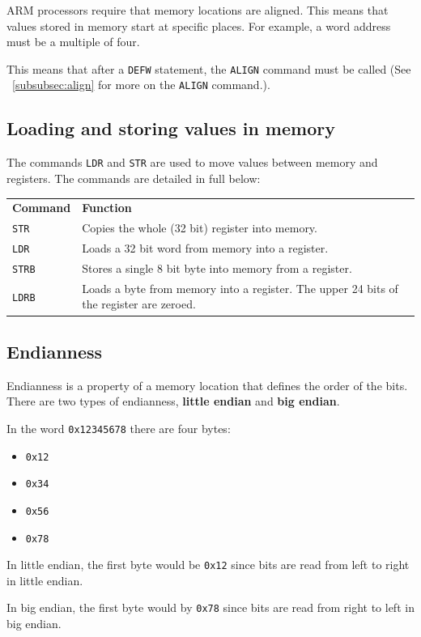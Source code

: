 ARM processors require that memory locations are aligned. This means that values stored in memory start at specific places. For example, a word address must be a multiple of four.

This means that after a {\tt DEFW} statement, the {\tt ALIGN} command must be called (See ~\ref{subsubsec:align} for more on the {\tt ALIGN} command.).

\subsection{Loading and storing values in memory}

The commands {\tt LDR} and {\tt STR} are used to move values between memory and registers. The commands are detailed in full below:

\begin{tabularx}{\textwidth}{l X}
	{\bf Command} & {\bf Function}\\
	{\tt STR} & Copies the whole (32 bit) register into memory.\\
	{\tt LDR} & Loads a 32 bit word from memory into a register.\\
	{\tt STRB} & Stores a single 8 bit byte into memory from a register.\\
	{\tt LDRB} & Loads a byte from memory into a register. The upper 24 bits of the register are zeroed.\\
\end{tabularx}

\subsection{Endianness}

Endianness is a property of a memory location that defines the order of the
bits. There are two types of endianness, {\bf little endian} and {\bf big
endian}.

In the word {\tt 0x12345678} there are four bytes:
\begin{itemize}
	\item {\tt 0x12}
	\item {\tt 0x34}
	\item {\tt 0x56}
	\item {\tt 0x78}
\end{itemize}

In little endian, the first byte would be {\tt 0x12} since bits are read from
left to right in little endian.

In big endian, the first byte would by {\tt 0x78} since bits are read from right
to left in big endian.

